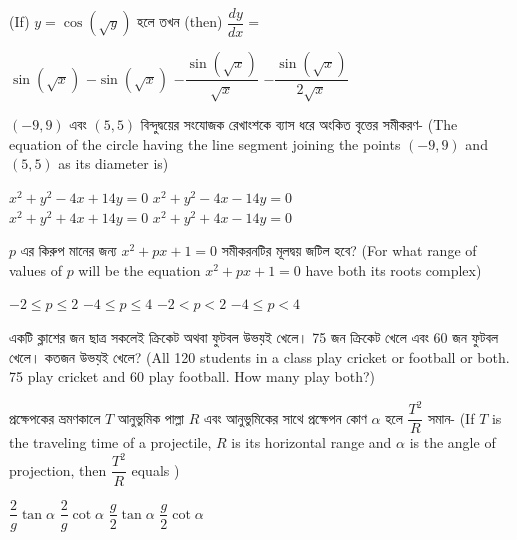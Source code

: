 \documentclass[addpoints]{exam}
\begin{document}
\begin{questions}
\question (If) $ y = \cos (\sqrt{y}) $ হলে তখন (then) $ \dfrac{dy}{dx} = $ 

\begin{oneparchoices}
\choice $ \sin (\sqrt{x}) $
\choice $ -\sin (\sqrt{x}) $
\choice $ -\dfrac{\sin (\sqrt{x})}{\sqrt{x}} $
\choice $ -\dfrac{\sin (\sqrt{x})}{2\sqrt{x}} $
\end{oneparchoices}

\question $ (-9,9) $ এবং $ (5,5) $ বিন্দুদ্বয়ের সংযোজক রেখাংশকে ব্যাস ধরে অংকিত বৃত্তের সমীকরণ- (The equation of the circle having the line segment joining the points $ (-9,9) $ and $ (5,5) $ as its diameter is) 

\begin{oneparchoices}
\choice $ x^{2}+y^{2}-4x+14y = 0 $
\choice $ x^{2}+y^{2}-4x-14y = 0 $\\
\hspace*{-.3cm}\choice $ x^{2}+y^{2}+4x+14y = 0 $
\choice $ x^{2}+y^{2}+4x-14y = 0 $
\end{oneparchoices}

\question $ p $ এর কিরুপ মানের জন্য $ x^{2}+px+1=0 $ সমীকরনটির মূলদ্বয় জটিল হবে? (For what range of values of $ p $ will be the equation $ x^{2}+px+1=0 $ have both its roots complex)

\begin{oneparchoices}
\choice $ -2\le p \le 2 $
\choice $ -4\le p \le 4 $
\choice $ -2< p < 2 $
\choice $ -4\le p < 4 $
\end{oneparchoices}

\question একটি ক্লাশের জন ছাত্র সকলেই ক্রিকেট অথবা ফুটবল উভয়ই খেলে। 75 জন ক্রিকেট খেলে এবং 60 জন ফুটবল খেলে। কতজন উভয়ই খেলে? (All 120 students in a class play cricket or football or both. 75 play cricket and 60 play football. How many play both?)

\begin{oneparchoices}
\end{oneparchoices}

\question   প্রক্ষেপকের ভ্রমণকালে $ T $ আনুভুমিক পাল্লা $ R $ এবং আনুভুমিকের সাথে প্রক্ষেপন কোণ $ \alpha $ হলে $ \dfrac{T^{2}}{R} $ সমান- (If $ T $ is the traveling time of a projectile, $ R $ is its horizontal range and $ \alpha $ is the angle of projection, then $ \dfrac{T^{2}}{R} $ equals )

\begin{oneparchoices}
\choice $ \dfrac{2}{g}\tan \alpha $
\choice $ \dfrac{2}{g}\cot \alpha $
\choice $ \dfrac{g}{2}\tan \alpha $
\choice $ \dfrac{g}{2}\cot \alpha $
\end{oneparchoices}


\end{questions}
\end{document}
